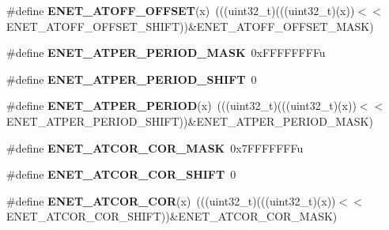 \begin{DoxyCompactItemize}
\item 
\#define {\bfseries E\+N\+E\+T\+\_\+\+A\+T\+O\+F\+F\+\_\+\+O\+F\+F\+S\+ET}(x)~(((uint32\+\_\+t)(((uint32\+\_\+t)(x))$<$$<$E\+N\+E\+T\+\_\+\+A\+T\+O\+F\+F\+\_\+\+O\+F\+F\+S\+E\+T\+\_\+\+S\+H\+I\+FT))\&E\+N\+E\+T\+\_\+\+A\+T\+O\+F\+F\+\_\+\+O\+F\+F\+S\+E\+T\+\_\+\+M\+A\+SK)\hypertarget{group__ENET__Register__Masks_ga5cf0d0c54f14f61d08d74f45edae8b40}{}\label{group__ENET__Register__Masks_ga5cf0d0c54f14f61d08d74f45edae8b40}

\item 
\#define {\bfseries E\+N\+E\+T\+\_\+\+A\+T\+P\+E\+R\+\_\+\+P\+E\+R\+I\+O\+D\+\_\+\+M\+A\+SK}~0x\+F\+F\+F\+F\+F\+F\+F\+Fu\hypertarget{group__ENET__Register__Masks_ga86f89e80c9b16d19744517af3d775f57}{}\label{group__ENET__Register__Masks_ga86f89e80c9b16d19744517af3d775f57}

\item 
\#define {\bfseries E\+N\+E\+T\+\_\+\+A\+T\+P\+E\+R\+\_\+\+P\+E\+R\+I\+O\+D\+\_\+\+S\+H\+I\+FT}~0\hypertarget{group__ENET__Register__Masks_gadef7d222ae0f44afa4379b3a27e89978}{}\label{group__ENET__Register__Masks_gadef7d222ae0f44afa4379b3a27e89978}

\item 
\#define {\bfseries E\+N\+E\+T\+\_\+\+A\+T\+P\+E\+R\+\_\+\+P\+E\+R\+I\+OD}(x)~(((uint32\+\_\+t)(((uint32\+\_\+t)(x))$<$$<$E\+N\+E\+T\+\_\+\+A\+T\+P\+E\+R\+\_\+\+P\+E\+R\+I\+O\+D\+\_\+\+S\+H\+I\+FT))\&E\+N\+E\+T\+\_\+\+A\+T\+P\+E\+R\+\_\+\+P\+E\+R\+I\+O\+D\+\_\+\+M\+A\+SK)\hypertarget{group__ENET__Register__Masks_gab2418a9dfbf8e0b5c7dd20714c14f791}{}\label{group__ENET__Register__Masks_gab2418a9dfbf8e0b5c7dd20714c14f791}

\item 
\#define {\bfseries E\+N\+E\+T\+\_\+\+A\+T\+C\+O\+R\+\_\+\+C\+O\+R\+\_\+\+M\+A\+SK}~0x7\+F\+F\+F\+F\+F\+F\+Fu\hypertarget{group__ENET__Register__Masks_gacbd6f1547546f95562a646e40ab095d3}{}\label{group__ENET__Register__Masks_gacbd6f1547546f95562a646e40ab095d3}

\item 
\#define {\bfseries E\+N\+E\+T\+\_\+\+A\+T\+C\+O\+R\+\_\+\+C\+O\+R\+\_\+\+S\+H\+I\+FT}~0\hypertarget{group__ENET__Register__Masks_ga5b25c79c73597f4700107d56a1cdcd91}{}\label{group__ENET__Register__Masks_ga5b25c79c73597f4700107d56a1cdcd91}

\item 
\#define {\bfseries E\+N\+E\+T\+\_\+\+A\+T\+C\+O\+R\+\_\+\+C\+OR}(x)~(((uint32\+\_\+t)(((uint32\+\_\+t)(x))$<$$<$E\+N\+E\+T\+\_\+\+A\+T\+C\+O\+R\+\_\+\+C\+O\+R\+\_\+\+S\+H\+I\+FT))\&E\+N\+E\+T\+\_\+\+A\+T\+C\+O\+R\+\_\+\+C\+O\+R\+\_\+\+M\+A\+SK)\hypertarget{group__ENET__Register__Masks_ga97bb4a4c75d59a21afb9972077f03374}{}\label{group__ENET__Register__Masks_ga97bb4a4c75d59a21afb9972077f03374}


\end{DoxyCompactItemize}

